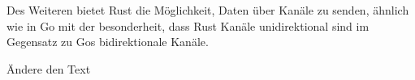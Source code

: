 \begin{figure}[htp]
    \centering
    
\end{figure}

Des Weiteren bietet Rust die Möglichkeit, Daten über Kanäle zu senden, ähnlich
wie in Go mit der besonderheit, dass Rust Kanäle unidirektional sind im Gegensatz
zu Gos bidirektionale Kanäle. \autocite{ChannelsRustExample}

Ändere den Text